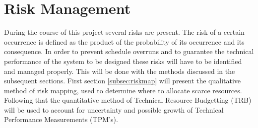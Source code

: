 \section{Risk Management}\label{cha:plan}
During the course of this project several risks are present. The risk of a certain occurrence is defined as the product of the probability of its occurrence and its consequence. In order to prevent schedule overruns and to guarantee the technical performance of the system to be designed these risks will have to be identified and managed properly. This will be done with the methods discussed in the subsequent sections. First section \ref{subsec:riskmap} will present the qualitative method of risk mapping, used to determine where to allocate scarce resources. Following that the quantitative method of Technical Resource Budgetting (TRB) will be used to account for uncertainty and possible growth of Technical Performance Measurements (TPM's).

